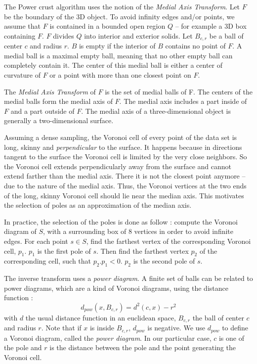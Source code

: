 \documentclass[12pt]{article}
\begin{document}
The Power crust algorithm uses the notion of the \textit{Medial Axis Transform}. Let $F$ be the boundary of the 3D object. To avoid infinity edges and/or points, we assume that $F$ is contained in a bounded open region $Q$ -- for example a 3D box containing $F$. $F$ divides $Q$ into interior and exterior solids. Let $B_{c,r}$ be a ball of center $c$ and radius $r$. $B$ is empty if the interior of $B$ contains no point of $F$. A medial ball is a maximal empty ball, meaning that no other empty ball can completely contain it. The center of this medial ball is either a center of curvature of $F$ or a point with more than one closest point on $F$.

The \textit{Medial Axis Transform} of $F$ is the set of medial balls of F. The centers of the medial balls form the medial axis of $F$. The medial axis includes a part inside of $F$ and a part outside of $F$. The medial axis of a three-dimensional object is generally a two-dimensional surface.

Assuming a dense sampling, the Voronoi cell of every point of the data set is long, skinny and \textit{perpendicular} to the surface. It happens because in directions tangent to the surface the Voronoi cell is limited by the very close neighbors. So the Voronoi cell extends perpendicularly away from the surface and cannot extend farther than the medial axis. There it is not the closest point anymore -- due to the nature of the medial axis. Thus, the Voronoi vertices at the two ends of the long, skinny Voronoi cell should lie near the median axis. This motivates the selection of poles as an approximation of the median axis.

In practice, the selection of the poles is done as follow : compute the Voronoi diagram of $S$, with a surrounding box of 8 vertices in order to avoid infinite edges. For each point $s \in S$, find the farthest vertex of the corresponding Voronoi cell, $p_1$. $p_1$ is the first pole of $s$. Then find the farthest vertex $p_2$ of the corresponding cell, such that $p_2.p_1 < 0$. $p_2$ is the second pole of $s$.

The inverse transform uses a \textit{power diagram}. A finite set of balls can be related to power diagrams, which are a kind of Voronoi diagrams, using the distance function :
$$d_{pow}(x, B_{c,r}) = d^2(c,x) - r^2$$
with $d$ the usual distance function in an euclidean space, $B_{c,r}$ the ball of center $c$ and radius $r$. Note that if $x$ is inside $B_{c,r}$, $d_{pow}$ is negative. We use $d_{pow}$ to define a Voronoi diagram, called the \textit{power diagram}. In our particular case, $c$ is one of the pole and $r$ is the distance between the pole and the point generating the Voronoi cell.
\end{document}

